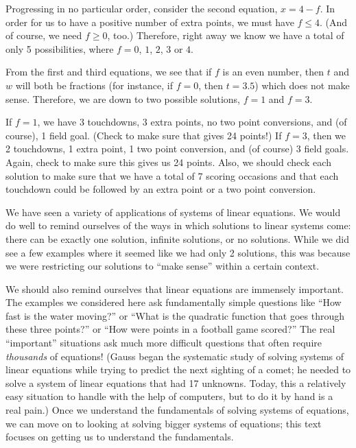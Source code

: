 {Progressing in no particular order, consider the second equation, $x = 4-f$. In order for us to have a positive number of extra points, we must have $f\leq 4$. (And of course, we need $f\geq 0$, too.) Therefore, right away we know we have a total of only 5 possibilities, where $f = 0$, $1$, $2$, $3$ or $4$.

From the first and third equations, we see that if $f$ is an even number, then $t$ and $w$ will both be fractions (for instance, if $f=0$, then $t = 3.5$) which does not make sense. Therefore, we are down to two possible solutions, $f = 1$ and $f=3$. 



If $f=1$, we have 3 touchdowns, 3 extra points, no two point conversions, and (of course), 1 field goal. (Check to make sure that gives 24 points!) If $f=3$, then we 2 touchdowns, 1 extra point, 1 two point conversion, and (of course) 3 field goals. Again, check to make sure this gives us 24 points. Also, we should check each solution to make sure that we have a total of 7 scoring occasions and that each touchdown could be followed by an extra point or a two point conversion.}

\medskip

We have seen a variety of applications of systems of linear equations. We would do well to remind ourselves of the ways in which solutions to linear systems come: there can be exactly one solution, infinite solutions, or no solutions. While we did see a few examples where it seemed like we had only 2 solutions, this was because we were restricting our solutions to ``make sense'' within a certain context. 

We should also remind ourselves that linear equations are immensely important. The examples we considered here ask fundamentally simple questions like ``How fast is the water moving?'' or ``What is the quadratic function that goes through these three points?'' or ``How were points in a football game scored?'' The real ``important'' situations ask much more difficult questions that often require \textit{thousands} of equations! (Gauss began the systematic study of solving systems of linear equations while trying to predict the next sighting of a comet; he needed to solve a system of linear equations that had 17 unknowns. Today, this a relatively easy situation to handle with the help of computers, but to do it by hand is a real pain.) Once we understand the fundamentals of solving systems of equations, we can move on to looking at solving bigger systems of equations; this text focuses on getting us to understand the fundamentals.\\




